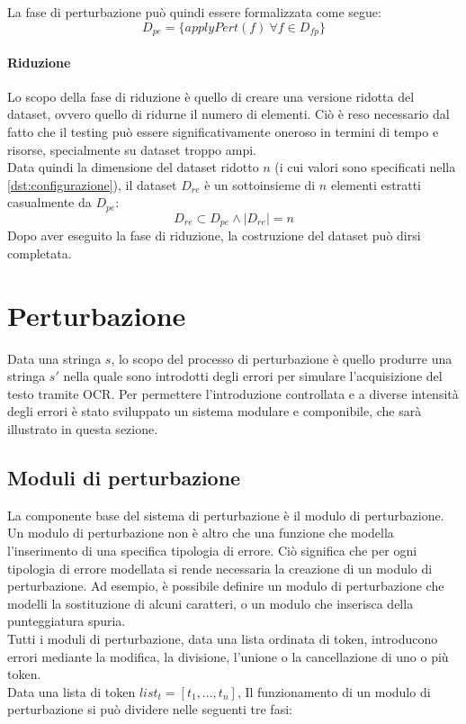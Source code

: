 La fase di perturbazione può quindi essere formalizzata come segue:
\begin{equation}
D_{pe} = \{applyPert(f)\ \forall f \in D_{fp}\}
\end{equation}

\paragraph{Riduzione}
Lo scopo della fase di riduzione è quello di creare una versione ridotta del dataset, ovvero quello di ridurne il numero di elementi. Ciò è reso necessario dal fatto che il testing può essere significativamente oneroso in termini di tempo e risorse, specialmente su dataset troppo ampi.\\
Data quindi la dimensione del dataset ridotto $n$ (i cui valori sono specificati nella \autoref{dst:configurazione}), il dataset $D_{re}$ è un sottoinsieme di $n$ elementi estratti casualmente da $D_{pe}$:
\begin{equation}
D_{re} \subset D_{pe} \wedge |D_{re}| = n
\end{equation}
Dopo aver eseguito la fase di riduzione, la costruzione del dataset può dirsi completata.


\section{Perturbazione}
\label{dst:perturbazione}
Data una stringa $s$, lo scopo del processo di perturbazione è quello produrre una stringa $s\prime$ nella quale sono introdotti degli errori per simulare l'acquisizione del testo tramite OCR. Per permettere l'introduzione controllata e a diverse intensità degli errori è stato sviluppato un sistema modulare e componibile, che sarà illustrato in questa sezione.

\subsection{Moduli di perturbazione}
\label{dst:modpert}
La componente base del sistema di perturbazione è il modulo di perturbazione. Un modulo di perturbazione non è altro che una funzione che modella l'inserimento di una specifica tipologia di errore. Ciò significa che per ogni tipologia di errore modellata si rende necessaria la creazione di un modulo di perturbazione. Ad esempio, è possibile definire un modulo di perturbazione che modelli la sostituzione di alcuni caratteri, o un modulo che inserisca della punteggiatura spuria. \\
Tutti i moduli di perturbazione, data una lista ordinata di token, introducono errori mediante la modifica, la divisione, l'unione o la cancellazione di uno o più token. \\
Data una lista di token $list_t = [t_1,...,t_n]$,
Il funzionamento di un modulo di perturbazione si può dividere nelle seguenti tre fasi:

